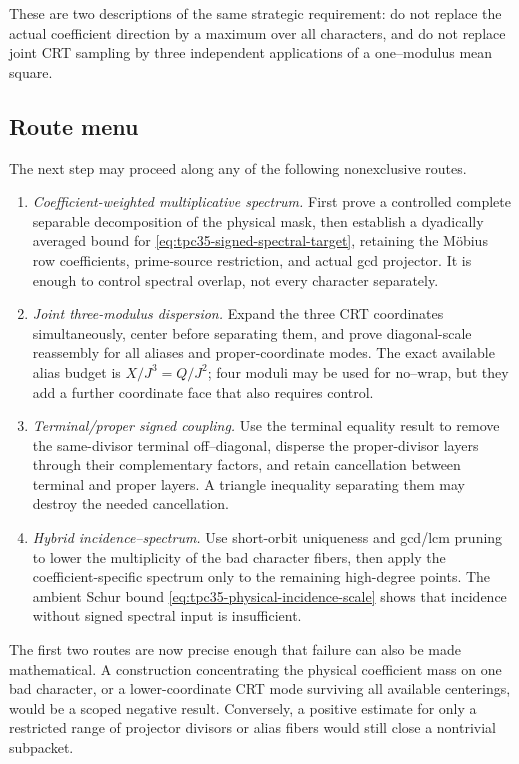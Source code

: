 These are two descriptions of the same strategic requirement:
do not replace the actual coefficient direction by a maximum over all
characters, and do not replace joint CRT sampling by three independent
applications of a one--modulus mean square.

\subsection{Route menu}

The next step may proceed along any of the following nonexclusive routes.
\begin{enumerate}[label=\textup{Route \Alph*:},leftmargin=5.8em]
 \item \emph{Coefficient-weighted multiplicative spectrum.}
 First prove a controlled complete separable decomposition of the physical
 mask, then establish a dyadically averaged bound for
 \eqref{eq:tpc35-signed-spectral-target}, retaining the M\"obius row
 coefficients, prime-source restriction, and actual gcd projector.  It is
 enough to control spectral overlap, not every character separately.

 \item \emph{Joint three-modulus dispersion.}
 Expand the three CRT coordinates simultaneously, center before
 separating them, and prove diagonal-scale reassembly for all aliases and
 proper-coordinate modes.  The exact available alias budget is
 \(X/J^3=Q/J^2\); four moduli may be used for no--wrap, but they add a
 further coordinate face that also requires control.

 \item \emph{Terminal/proper signed coupling.}
 Use the terminal equality result to remove the same-divisor terminal
 off--diagonal, disperse the proper-divisor layers through their
 complementary factors, and retain cancellation between terminal and
 proper layers.  A triangle inequality separating them may destroy the
 needed cancellation.

 \item \emph{Hybrid incidence--spectrum.}
 Use short-orbit uniqueness and gcd/lcm pruning to lower the multiplicity
 of the bad character fibers, then apply the coefficient-specific
 spectrum only to the remaining high-degree points.  The ambient Schur
 bound \eqref{eq:tpc35-physical-incidence-scale} shows that incidence
 without signed spectral input is insufficient.
\end{enumerate}

The first two routes are now precise enough that failure can also be made
mathematical.  A construction concentrating the physical coefficient
mass on one bad character, or a lower-coordinate CRT mode surviving all
available centerings, would be a scoped negative result.  Conversely, a
positive estimate for only a restricted range of projector divisors or
alias fibers would still close a nontrivial subpacket.

